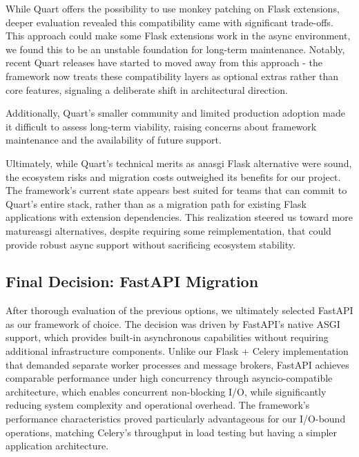         While Quart offers the possibility to use monkey patching on Flask extensions, deeper evaluation revealed this 
        compatibility came with significant trade-offs. This approach could make some Flask extensions work in the 
        async environment, we found this to be an unstable foundation for long-term maintenance. Notably, recent Quart 
        releases have started to moved away from this approach  - the framework now treats these compatibility layers 
        as optional extras rather than core features, signaling a deliberate shift in architectural direction.

        Additionally, Quart's smaller community and limited production adoption made it difficult to assess long-term viability, 
        raising concerns about framework maintenance and the availability of future support.

        Ultimately, while Quart's technical merits as an\ac{asgi} Flask alternative were sound, the ecosystem risks and migration 
        costs outweighed its benefits for our project. The framework's current state appears best suited for teams that 
        can commit to Quart's entire stack, rather than as a migration path for existing Flask applications with extension 
        dependencies. This realization steered us toward more mature\ac{asgi} alternatives, despite requiring some 
        reimplementation, that could provide robust async support without sacrificing ecosystem stability.

    \subsection{Final Decision: FastAPI Migration}

        After thorough evaluation of the previous options, we ultimately selected FastAPI as our framework of choice. 
        The decision was driven by FastAPI's native \ac{ASGI} support, which provides built-in asynchronous capabilities 
        without requiring additional infrastructure components. Unlike our Flask + Celery implementation that demanded 
        separate worker processes and message brokers, FastAPI achieves comparable performance under high concurrency through 
        asyncio-compatible architecture, which enables concurrent non-blocking I/O, while significantly reducing system 
        complexity and operational overhead. The framework's performance characteristics proved particularly advantageous 
        for our I/O-bound operations, matching Celery's throughput in load testing but having a simpler application 
        architecture.

